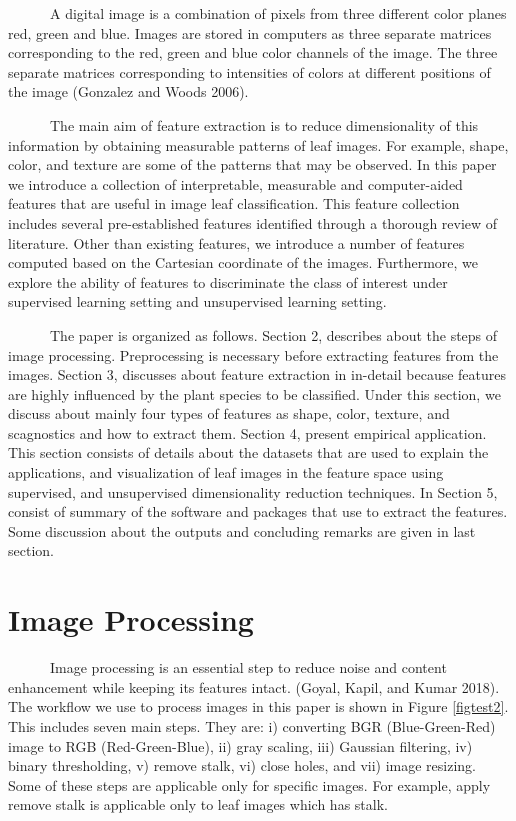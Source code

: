 \documentclass{article}
\begin{document}
~~~~~~A digital image is a combination of pixels from three different
color planes red, green and blue. Images are stored in computers as
three separate matrices corresponding to the red, green and blue color
channels of the image. The three separate matrices corresponding to
intensities of colors at different positions of the image (Gonzalez and
Woods 2006).

~~~~~~The main aim of feature extraction is to reduce dimensionality of
this information by obtaining measurable patterns of leaf images. For
example, shape, color, and texture are some of the patterns that may be
observed. In this paper we introduce a collection of interpretable,
measurable and computer-aided features that are useful in image leaf
classification. This feature collection includes several pre-established
features identified through a thorough review of literature. Other than
existing features, we introduce a number of features computed based on
the Cartesian coordinate of the images. Furthermore, we explore the
ability of features to discriminate the class of interest under
supervised learning setting and unsupervised learning setting.

~~~~~~The paper is organized as follows. Section 2, describes about the
steps of image processing. Preprocessing is necessary before extracting
features from the images. Section 3, discusses about feature extraction
in in-detail because features are highly influenced by the plant species
to be classified. Under this section, we discuss about mainly four types
of features as shape, color, texture, and scagnostics and how to extract
them. Section 4, present empirical application. This section consists of
details about the datasets that are used to explain the applications,
and visualization of leaf images in the feature space using supervised,
and unsupervised dimensionality reduction techniques. In Section 5,
consist of summary of the software and packages that use to extract the
features. Some discussion about the outputs and concluding remarks are
given in last section.

\hypertarget{image-processing}{%
\section{Image Processing}\label{image-processing}}

~~~~~~Image processing is an essential step to reduce noise and content
enhancement while keeping its features intact. (Goyal, Kapil, and Kumar
2018). The workflow we use to process images in this paper is shown in
Figure \ref{figtest2}. This includes seven main steps. They are: i)
converting BGR (Blue-Green-Red) image to RGB (Red-Green-Blue), ii) gray
scaling, iii) Gaussian filtering, iv) binary thresholding, v) remove
stalk, vi) close holes, and vii) image resizing. Some of these steps are
applicable only for specific images. For example, apply remove stalk is
applicable only to leaf images which has stalk.
\end{document}
